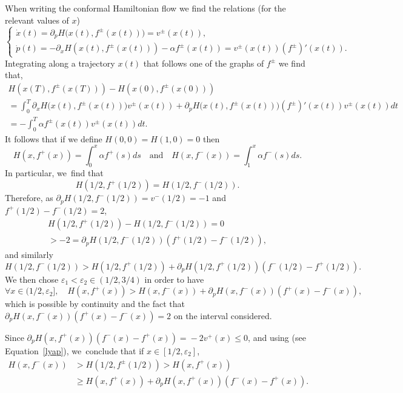 \documentclass[10pt]{amsart}
\theoremstyle{definition}
\begin{document}
\begin{appendix}
When writing the conformal Hamiltonian flow we find the relations (for the relevant values of $x$)
\[
\begin{cases}
\dot x(t) = \partial_p H\bigl(x(t), f^\pm(x(t))\bigr) = v^\pm (x(t)), \\
\dot p(t) = -\partial_x H(x(t), f^\pm(x(t)))-\alpha f^{\pm}(x(t)) = v^\pm(x(t))(f^{\pm})'(x(t)).
\end{cases}
\]
Integrating along a trajectory $x(t)$ that follows one of the graphs of $f^\pm$ we find that,\vspace*{-5pt}
\begin{multline*}
H(x(T), f^\pm(x(T)))-H(x(0), f^\pm(x(0)))\\[-2pt]
=\int_0^T \partial_x H\bigl(x(t), f^\pm(x(t))\bigr) v^\pm (x(t)) + \partial_p H\bigl(x(t), f^\pm(x(t))\bigr)(f^{\pm})'(x(t)) v^\pm (x(t)) dt \\[-3pt]
= -\int_0^T \alpha f^\pm(x(t))v^\pm (x(t)) dt .
\end{multline*}
It follows that if we define $H(0,0) = H(1,0) = 0$ then\vspace*{-3pt}
\begin{equation}\label{lyap}
H(x,f^+(x))= \int_0^x \alpha f^+(s) ds \quad\text{and}\quad H(x,f^-(x))= \int_1^x \alpha f^-(s) ds.
\end{equation}
In particular, we~find that\vspace*{-5pt}
\[
H(1/2, f^+(1/2)) =H(1/2, f^-(1/2)).
\]
Therefore, as $\partial_p H(1/2, f^-(1/2))= v^-(1/2)=-1$ and $f^+(1/2)-f^-(1/2)=2$,\vspace*{-5pt}
\begin{multline*}
H(1/2, f^+(1/2))-H(1/2, f^-(1/2))=0\\
>-2= \partial_p H(1/2, f^-(1/2))(f^+(1/2)-f^-(1/2)),
\end{multline*}
and similarly
\[
H(1/2, f^-(1/2))>H(1/2, f^+(1/2)) + \partial_p H(1/2, f^+(1/2))(f^-(1/2)-f^+(1/2)).
\]
We then chose $\varepsilon_1<\varepsilon_2\in (1/2,3/4)$ in order to have\vspace*{-3pt}
\begin{equation}\label{cond1}
\forall x\in (1/2,\varepsilon_2], \quad H(x, f^+(x))>H(x, f^-(x)) + \partial_p H(x, f^-(x))(f^+(x)-f^-(x)),
\end{equation}
which is possible by continuity and the fact that $ \partial_p H(x, f^-(x))(f^+(x)-f^-(x))= 2$ on the interval considered.

Since $\partial_p H(x, f^+(x))(f^-(x)\!-\!f^+(x)) \!=\! -2v^+(x)\leq 0$, and using (see Equation~\eqref{lyap}), we~conclude that if $x\in [1/2,\varepsilon_2]$,\vspace*{-3pt}
\begin{equation}\label{cond2}
\begin{aligned}
H(x,f^-(x))&> H(1/2,f^\pm(1/2))>
H(x,f^+(x))\\ 
&\geq H(x,f^+(x)) +\partial_p H(x, f^+(x))(f^-(x)-f^+(x)).
\end{aligned}
\end{equation}


\end{appendix}
\end{document}
